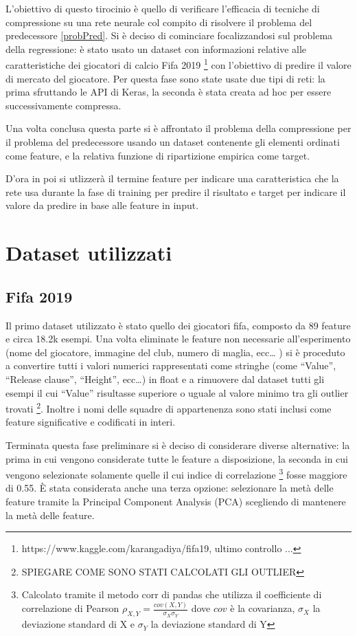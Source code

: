 \documentclass[12pt]{report}
\begin{document}
L'obiettivo di questo tirocinio è quello di verificare l'efficacia di tecniche di compressione su una rete neurale col compito di risolvere il problema del predecessore \ref{probPred}.
Si è deciso di cominciare focalizzandosi sul problema della regressione: è stato usato un dataset con informazioni relative alle caratteristiche dei giocatori di calcio Fifa 2019 \footnote{https://www.kaggle.com/karangadiya/fifa19, ultimo controllo ...} con l’obiettivo di predire il valore di mercato del giocatore. Per questa fase sono state usate due tipi di reti: la prima sfruttando le API di Keras, la seconda è stata creata ad hoc per essere successivamente compressa.

Una volta conclusa questa parte si è affrontato il problema della compressione per il problema del predecessore usando un dataset contenente gli elementi ordinati come feature, e la relativa funzione di ripartizione empirica come target.

D'ora in poi si utlizzerà il termine feature per indicare una caratteristica che la rete usa durante la fase di training per predire il risultato e target per indicare il valore da predire in base alle feature in input.

\section{Dataset utilizzati}

\subsection{Fifa 2019}

Il primo dataset utilizzato è stato quello dei giocatori fifa, composto da 89 feature e circa 18.2k esempi. 
Una volta eliminate le feature non necessarie all’esperimento (nome del giocatore, immagine del club, numero di maglia, ecc… ) si è proceduto a convertire tutti i valori numerici rappresentati come stringhe (come “Value”, “Release clause”, “Height”, ecc…) in float e a rimuovere dal dataset tutti gli esempi il cui “Value” risultasse superiore o uguale al valore minimo tra gli outlier trovati \footnote{SPIEGARE COME SONO STATI CALCOLATI GLI OUTLIER}. Inoltre i nomi delle squadre di appartenenza sono stati inclusi come feature significative e codificati in interi.

Terminata questa fase preliminare si è deciso di considerare diverse alternative: la prima in cui vengono considerate tutte le feature a disposizione, la seconda in cui vengono selezionate solamente quelle il cui indice di correlazione \footnote{Calcolato tramite il metodo corr di pandas che utilizza il coefficiente di correlazione di Pearson $\rho_{X,Y} = \frac{cov(X, Y)}{\sigma_X\sigma_Y}$ dove $cov$ è la covarianza, $\sigma_X$ la deviazione standard di X e $\sigma_Y$ la deviazione standard di Y} fosse maggiore di 0.55.
È stata considerata anche una terza opzione: selezionare la metà delle feature tramite la Principal Component Analysis (PCA) scegliendo di mantenere la metà delle feature. 
\end{document}
